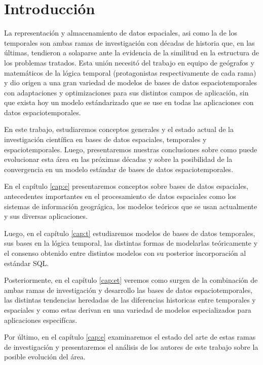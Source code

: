 \chapter{Introducción} \label{cap:intro}

La representación y almacenamiento de datos espaciales, asi como la de los temporales son ambas ramas de investigación con décadas de historia que, en las últimas, tendieron a solaparse ante la evidencia de la similitud en la estructura de los problemas tratados. Esta unión necesitó del trabajo en equipo de geógrafos y matemáticos de la lógica temporal (protagonistas respectivamente de cada rama) y dio origen a una gran variedad de modelos de bases de datos espaciotemporales con adaptaciones y optimizaciones para sus distintos campos de aplicación, sin que exista hoy un modelo estándarizado que se use en todas las aplicaciones con datos espaciotemporales.

En este trabajo, estudiaremos conceptos generales y el estado actual de la investigación científica en bases de datos espaciales, temporales y espaciotemporales. Luego, presentaremos nuestras conclusiones sobre como puede evolucionar esta área en las próximas décadas y sobre la posibilidad de la convergencia en un modelo estándar de bases de datos espaciotemporales.

En el capítulo \ref{cap:e} presentaremos conceptos sobre bases de datos espaciales, antecedentes importantes en el procesamiento de datos espaciales como los sistemas de información geográgica, los modelos teóricos que se usan actualmente y sus diversas aplicaciones.

Luego, en el capítulo \ref{cap:t} estudiaremos modelos de bases de datos temporales, sus bases en la lógica temporal, las distintas formas de modelarlas teóricamente y el consenso obtenido entre distintos modelos con su posterior incorporación al estándar SQL.

Posteriormente, en el capítulo \ref{cap:et} veremos como surgen de la combinación de ambas ramas de investigación y desarrollo las bases de datos espaciotemporales, las distintas tendencias heredadas de las diferencias historicas entre temporales y espaciales y como estas derivan en una variedad de modelos especializados para aplicaciones especifícas.

Por último, en el capítulo \ref{cap:e} examinaremos el estado del arte de estas ramas de investigación y presentaremos el análisis de los autores de este trabajo sobre la posible evolución del área.
